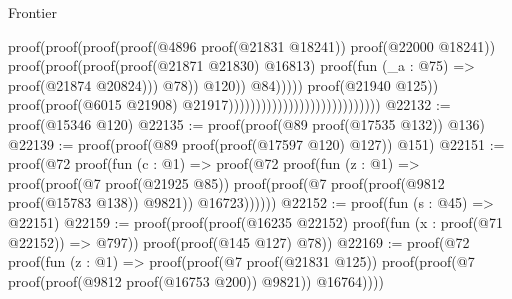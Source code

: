 \begin{lexlean}{Frontier}
\begin{coremodule}
                                                                                            proof(proof(proof(proof(@4896
                                                                                                      proof(@21831
                                                                                                          @18241))
                                                                                                    proof(@22000
                                                                                                        @18241))
                                                                                                  proof(proof(proof(proof(@21871
                                                                                                            @21830)
                                                                                                          @16813)
                                                                                                        proof(fun (_a : @75) =>
                                                                                                          proof(@21874
                                                                                                              @20824)))
                                                                                                      @78))
                                                                                                @120))
                                                                                          @84)))))
                                                                            proof(@21940 @125))
                                                                          proof(proof(@6015 @21908)
                                                                              @21917))))))))))))))))))))))))))))
@22132 := proof(@15346 @120)
@22135 := proof(proof(@89 proof(@17535 @132)) @136)
@22139 := proof(proof(@89 proof(proof(@17597 @120) @127)) @151)
@22151 := proof(@72
      proof(fun (c : @1) =>
        proof(@72
            proof(fun (z : @1) =>
              proof(proof(@7 proof(@21925 @85))
                  proof(proof(@7 proof(proof(@9812 proof(@15783 @138)) @9821)) @16723))))))
@22152 := proof(fun (s : @45) => @22151)
@22159 := proof(proof(proof(@16235 @22152) proof(fun (x : proof(@71 @22152)) => @797))
      proof(proof(@145 @127) @78))
@22169 := proof(@72
      proof(fun (z : @1) =>
        proof(proof(@7 proof(@21831 @125))
            proof(proof(@7 proof(proof(@9812 proof(@16753 @200)) @9821)) @16764))))

\end{coremodule}
\end{lexlean}

